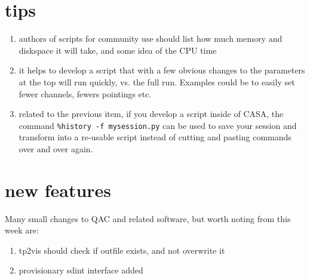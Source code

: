 \documentclass[12pt,a4paper]{article}
\begin{document}
\section{tips}

\begin{enumerate}

\item authors of scripts for community use should list how much memory and diskspace it will take, and some idea of the CPU time

\item it helps to develop a script that with a few obvious changes to the parameters at the top will run quickly, vs. the full run.
  Examples could be to easily set fewer channels, fewers pointings etc.

\item related to the previous item,
  if you develop a script inside of CASA, the command \verb+%history -f mysession.py+ can be used to save your session and
  transform into a re-usable script instead of cutting and pasting commands over and over again.
  
\end{enumerate}


\section{new features}

Many small changes to QAC and related software, but worth noting
from this week are:

\begin{enumerate}

\item tp2vis should check if outfile exists, and not overwrite it

\item provisionary sdint interface added 
  
\end{enumerate}
\end{document}
